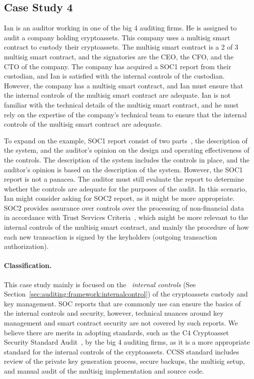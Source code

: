\subsection{Case Study 4} \label{sec:auditing:case-studies:internalcontrol} %
Ian is an auditor working in one of the big 4 auditing firms. He is assigned to audit a company holding cryptoassets. This company uses a multisig smart contract to custody their cryptoassets. The multisig smart contract is a 2 of 3 multisig smart contract, and the signatories are the CEO, the CFO, and the CTO of the company. The company has acquired a SOC1 report from their custodian, and Ian is satisfied with the internal controls of the custodian. However, the company has a multisig smart contract, and Ian must ensure that the internal controls of the multisig smart contract are adequate. Ian is not familiar with the technical details of the multisig smart contract, and he must rely on the expertise of the company's technical team to ensure that the internal controls of the multisig smart contract are adequate.

To expand on the example, SOC1 report consist of two parts~\cite{RCGTsocreport}, the description of the system, and the auditor's opinion on the design and operating effectiveness of the controls. The description of the system includes the controls in place, and the auditor's opinion is based on the description of the system. However, the SOC1 report is not a panacea. The auditor must still evaluate the report to determine whether the controls are adequate for the purposes of the audit. In this scenario, Ian might consider asking for SOC2 report, as it might be more appropriate. SOC2 provides assurance over controls over the processing of non-financial data in accordance with Trust Services Criteria~\cite{bdosocreports}, which might be more relevant to the internal controls of the multisig smart contract, and mainly the procedure of how each new transaction is signed by the keyholders (\eg outgoing transaction authorization). 

\paragraph{Classification.} This case study mainly is focused on the ~\textit{internal controls} (See Section~\ref{sec:auditing:framework:internalcontrol}) of the cryptoassets custody and key management. SOC reports that are commonly use can ensure the basics of the internal controls and security, however, technical nuances around key management and smart contract security are not covered by such reports. We believe there are merits in adopting standards, such as the C4 Cryptoasset Security Standard Audit~\cite{c4ccssa}, by the big 4 auditing firms, as it is a more appropriate standard for the internal controls of the cryptoassets. CCSS standard includes review of the private key generation process, secure backups, the multisig setup, and manual audit of the multisig implementation and source code. 

